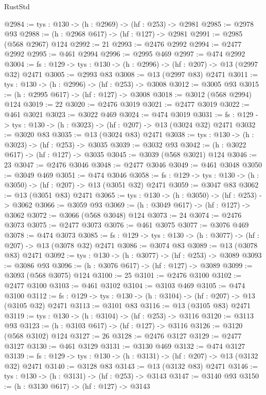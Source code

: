 \begin{lexlean}{RustStd}
\begin{coremodule}
{\begin{coremodule}
{{{{{{{{{{{{{{{@2984 := {tys : @130} -> (h : @2969) -> (hf : @253) -> @2981
@2985 := @2978 @93
@2988 := (h : @2968 @617) -> (hf : @127) -> @2981
@2991 := @2985 (@568 @2967) @124
@2992 := 21
@2993 := @2476 @2992
@2994 := @2477 @2992
@2995 := @461 @2994
@2996 := @2995 @469
@2997 := @474 @2992
@3004 := {fs : @129} -> {tys : @130} -> (h : @2996) -> (hf : @207) -> @13 (@2997 @32) @2471
@3005 := @2993 @83
@3008 := @13 (@2997 @83) @2471
@3011 := {tys : @130} -> (h : @2996) -> (hf : @253) -> @3008
@3012 := @3005 @93
@3015 := (h : @2995 @617) -> (hf : @127) -> @3008
@3018 := @3012 (@568 @2994) @124
@3019 := 22
@3020 := @2476 @3019
@3021 := @2477 @3019
@3022 := @461 @3021
@3023 := @3022 @469
@3024 := @474 @3019
@3031 := {fs : @129} -> {tys : @130} -> (h : @3023) -> (hf : @207) -> @13 (@3024 @32) @2471
@3032 := @3020 @83
@3035 := @13 (@3024 @83) @2471
@3038 := {tys : @130} -> (h : @3023) -> (hf : @253) -> @3035
@3039 := @3032 @93
@3042 := (h : @3022 @617) -> (hf : @127) -> @3035
@3045 := @3039 (@568 @3021) @124
@3046 := 23
@3047 := @2476 @3046
@3048 := @2477 @3046
@3049 := @461 @3048
@3050 := @3049 @469
@3051 := @474 @3046
@3058 := {fs : @129} -> {tys : @130} -> (h : @3050) -> (hf : @207) -> @13 (@3051 @32) @2471
@3059 := @3047 @83
@3062 := @13 (@3051 @83) @2471
@3065 := {tys : @130} -> (h : @3050) -> (hf : @253) -> @3062
@3066 := @3059 @93
@3069 := (h : @3049 @617) -> (hf : @127) -> @3062
@3072 := @3066 (@568 @3048) @124
@3073 := 24
@3074 := @2476 @3073
@3075 := @2477 @3073
@3076 := @461 @3075
@3077 := @3076 @469
@3078 := @474 @3073
@3085 := {fs : @129} -> {tys : @130} -> (h : @3077) -> (hf : @207) -> @13 (@3078 @32) @2471
@3086 := @3074 @83
@3089 := @13 (@3078 @83) @2471
@3092 := {tys : @130} -> (h : @3077) -> (hf : @253) -> @3089
@3093 := @3086 @93
@3096 := (h : @3076 @617) -> (hf : @127) -> @3089
@3099 := @3093 (@568 @3075) @124
@3100 := 25
@3101 := @2476 @3100
@3102 := @2477 @3100
@3103 := @461 @3102
@3104 := @3103 @469
@3105 := @474 @3100
@3112 := {fs : @129} -> {tys : @130} -> (h : @3104) -> (hf : @207) -> @13 (@3105 @32) @2471
@3113 := @3101 @83
@3116 := @13 (@3105 @83) @2471
@3119 := {tys : @130} -> (h : @3104) -> (hf : @253) -> @3116
@3120 := @3113 @93
@3123 := (h : @3103 @617) -> (hf : @127) -> @3116
@3126 := @3120 (@568 @3102) @124
@3127 := 26
@3128 := @2476 @3127
@3129 := @2477 @3127
@3130 := @461 @3129
@3131 := @3130 @469
@3132 := @474 @3127
@3139 := {fs : @129} -> {tys : @130} -> (h : @3131) -> (hf : @207) -> @13 (@3132 @32) @2471
@3140 := @3128 @83
@3143 := @13 (@3132 @83) @2471
@3146 := {tys : @130} -> (h : @3131) -> (hf : @253) -> @3143
@3147 := @3140 @93
@3150 := (h : @3130 @617) -> (hf : @127) -> @3143
}}}}}}}}}}}}}}}
\end{coremodule}}
\end{coremodule}
\end{lexlean}
